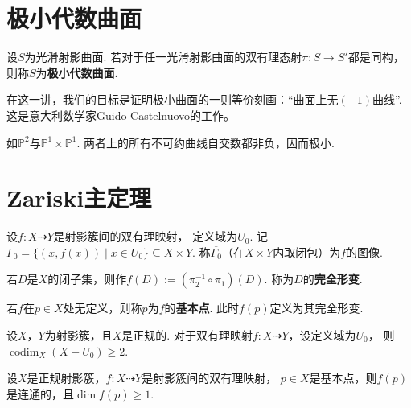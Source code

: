 \newcommand{\codim}{\operatorname{codim}}

\section{极小代数曲面}
\begin{definition}
    设$S$为光滑射影曲面. 
    若对于任一光滑射影曲面的双有理态射$\pi:S \to S'$都是同构，
    则称$S$为\bf{极小代数曲面}.
\end{definition}

在这一讲，我们的目标是证明极小曲面的一则等价刻画：“曲面上无$(-1)$曲线”.
这是意大利数学家Guido Castelnuovo的工作。

\begin{example}
    如$\mathbb{P}^{2}$与$\mathbb{P}^{1} \times \mathbb{P}^{1}$.
    两者上的所有不可约曲线自交数都非负，因而极小.
\end{example}

\section{Zariski主定理}
\begin{definition}
    设$f:X \dashrightarrow Y$是射影簇间的双有理映射，
    定义域为$U_{0}$. 
    记$\Gamma_{0} = \{(x,f(x)) \mid x \in U_{0}\} \subseteq X \times Y$.
    称$\overline{\Gamma_{0}}$（在$X \times Y$内取闭包）为$f$的图像. 

    若$D$是$X$的闭子集，则作$f(D) := (\pi_{2}^{-1} \circ \pi_{1})(D)$.
    称为$D$的\textbf{完全形变}.
    
    若$f$在$p \in X$处无定义，则称$p$为$f$的\textbf{基本点}. 
    此时$f(p)$定义为其完全形变.
\end{definition}

\begin{lemma}\label{basefinite}
    设$X$，$Y$为射影簇，且$X$是正规的. 
    对于双有理映射$f:X \dashrightarrow Y$，设定义域为$U_{0}$，
    则$\codim_{X}(X - U_{0}) \geq 2$.
\end{lemma}

\begin{theorem}
    设$X$是正规射影簇，$f\colon X \dashrightarrow Y$是射影簇间的双有理映射，
    $p \in X$是基本点，则$f(p)$是连通的，且$\dim f(p) \geq 1$.
\end{theorem}

